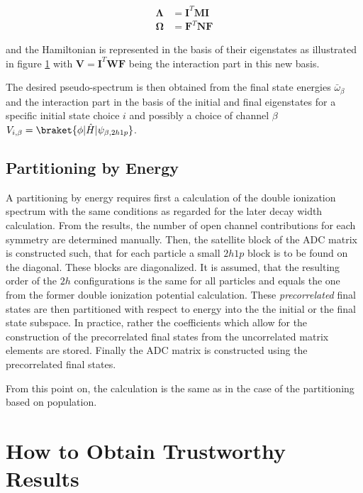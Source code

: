 \begin{align}
  \mathbf{\Lambda} &= \mathbf{I}^T \mathbf{M} \mathbf{I}  \\
  \mathbf{\Omega}  &= \mathbf{F}^T \mathbf{N} \mathbf{F} 
\end{align}

and the Hamiltonian is represented in the basis of their eigenstates
as illustrated in
figure \ref{figure:fano_bastrans} with $\mathbf{V} = \mathbf{I}^T \mathbf{W} \mathbf{F}$
being the interaction part
in this new basis.

\begin{figure}[h]
  \centering
  
  \caption{}
  \label{figure:fano_bastrans}
\end{figure}
The desired pseudo-spectrum is then obtained from the final state energies
$\bar{\omega}_\beta$ and the interaction part in the basis of the initial and
final eigenstates for a specific initial state choice $i$ and possibly a choice
of channel $\beta$
$V_{i,\beta} = \braket{\phi |\hat{H}| \psi_{\beta, 2h1p}}$.



\subsection{Partitioning by Energy}
A partitioning by energy requires first a calculation of the double ionization
spectrum with the same conditions as regarded for the later decay width
calculation. From the results, the number of open channel contributions
for each symmetry are determined manually. Then, the satellite block
of the \ac{ADC} matrix is constructed such, that for each particle a
small $2h1p$ block is to be found on the diagonal. These blocks are diagonalized.
It is assumed, that the resulting order of the $2h$ configurations is the
same for all particles and equals the one from the former double ionization
potential calculation. These \textit{precorrelated} final states are then
partitioned with respect to energy into the the initial or the final state
subspace. In practice, rather the coefficients which allow for the construction
of the precorrelated final states from the uncorrelated matrix elements are stored.
Finally the \ac{ADC} matrix is constructed using the precorrelated final states.

From this point on, the calculation is the same as in the case of the partitioning
based on population.


\section{How to Obtain Trustworthy Results}
